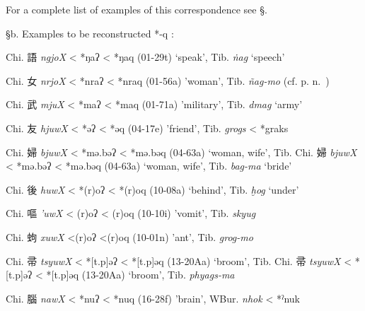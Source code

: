For a \emph{ }complete list of examples of this correspondence see §.

§b. Examples to be reconstructed *-q :

\begin{description} \item
Chi. 語  \emph{ngjoX} \textless{} *ŋaʔ \textless{} *ŋaq (01-29t) `speak',
Tib. {} \emph{ṅag} `speech'

\item
Chi. 女  \emph{nrjoX} \textless{} *nraʔ \textless{} *nraq (01-56a)
'woman', Tib. {} \emph{ñag-mo} (cf. p. n.~)

\item
Chi. 武  \emph{mjuX} \textless{} *maʔ \textless{} *maq (01-71a)
'military', Tib. {} \emph{dmag} `army'

\item
Chi. 友  \emph{hjuwX} \textless{} *{}əʔ \textless{} *{}əq (04-17e)
'friend', Tib. {} \emph{grogs} \textless{} *g{}raks

\item
Chi. 婦  \emph{bjuwX} \textless{} *mə.bəʔ \textless{} *mə.bəq (04-63a)
`woman, wife', Tib. 
Chi. 婦
 \emph{bjuwX} \textless{} *mə.bəʔ \textless{} *mə.bəq (04-63a) `woman,
wife', Tib. {} \emph{bag-ma} `bride'
\item
Chi. 後  \emph{huwX} \textless{} *{}(r)oʔ \textless{}
*{}(r)oq (10-08a) `behind', Tib. {} \emph{ḫog} `under'
\item
Chi. 嘔 \emph{'uwX} \textless{} {}(r)oʔ \textless{} {}(r)oq (10-10i)
'vomit', 
Tib. 
{} \emph{skyug}
\item
Chi. 蚼  \emph{xuwX} \textless{}{}{}(r)oʔ \textless{}{}{}(r)oq (10-01n)
'ant', Tib. {} \emph{grog-mo}
\item
Chi. 帚  \emph{tsyuwX} \textless{} *[t.p]əʔ \textless{} *[t.p]əq
(13-20Aa) `broom', Tib. %
Chi. 帚
 \emph{tsyuwX} \textless{} *[t.p]əʔ \textless{} *[t.p]əq
(13-20Aa) `broom', Tib. {} \emph{phyags-ma}
\item
Chi. 腦  \emph{nawX} \textless{} *n{}uʔ \textless{} *n{}uq (16-28f)
'brain', WBur. {} \emph{nhok} \textless{} *ˀnuk
\end{description}


